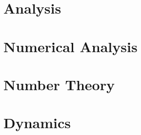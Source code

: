 \documentclass{book}
\theoremstyle{plain}
\theoremstyle{definition}
\numberwithin{equation}{section}
\begin{document}
\part{Analysis}
	
%
%
%

%
%
%
\part{Numerical Analysis}
%
%
%

\part{Number Theory}

\part{Dynamics}


\end{document}
